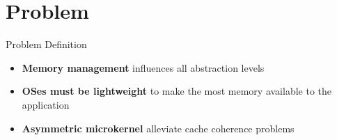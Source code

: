 \section{Problem}

	\begin{frame}{Problem Definition}
		\begin{itemize}
			\setlength\itemsep{5mm}
			\item \textbf{Memory management} influences all abstraction levels
			\item \textbf{OSes must be lightweight} to make the most memory
				available to the application
			\item \textbf{Asymmetric microkernel} alleviate cache coherence problems
		\end{itemize}
	\end{frame}

